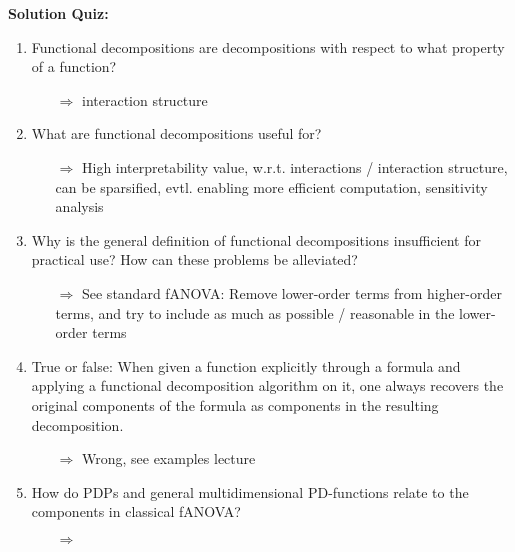 \textbf{Solution Quiz:}\\\noindent
\medskip

\begin{enumerate}

    \item 
    Functional decompositions are decompositions with respect to what property of a function?
    \begin{itemize}
        \item[$\Rightarrow$] interaction structure
    \end{itemize}
    \item 
    What are functional decompositions useful for?
    \begin{itemize}
        \item[$\Rightarrow$] High interpretability value, w.r.t. interactions / interaction structure, can be sparsified, evtl. enabling more efficient computation, sensitivity analysis
    \end{itemize}
    \item 
    Why is the general definition of functional decompositions insufficient for practical use? How can these problems be alleviated?
    \begin{itemize}
        \item[$\Rightarrow$] See standard fANOVA: Remove lower-order terms from higher-order terms, and try to include as much as possible / reasonable in the lower-order terms
    \end{itemize}
    \item 
    True or false: When given a function explicitly through a formula and applying a functional decomposition algorithm on it, one always recovers the original components of the formula as components in the resulting decomposition.
    \begin{itemize}
        \item[$\Rightarrow$] Wrong, see examples lecture
    \end{itemize}
    \item 
    How do PDPs and general multidimensional PD-functions relate to the components in classical fANOVA?
    \begin{itemize}
        \item[$\Rightarrow$] 
    \end{itemize}

\end{enumerate}

